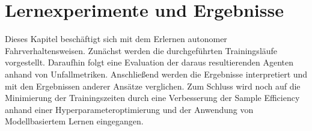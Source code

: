 
\cleardoublepage
\chapter{Lernexperimente und Ergebnisse}\label{ch:TrainingsAndResults}

Dieses Kapitel beschäftigt sich mit dem Erlernen autonomer Fahrverhaltensweisen.
Zunächst werden die durchgeführten Trainingsläufe vorgestellt. Daraufhin folgt
eine Evaluation der daraus resultierenden Agenten anhand von Unfallmetriken.
Anschließend werden die Ergebnisse interpretiert und mit den Ergebnissen anderer
Ansätze verglichen. Zum Schluss wird noch auf die Minimierung der Trainingszeiten
durch eine Verbesserung der Sample Efficiency anhand einer Hyperparameteroptimierung
und der Anwendung von Modellbasiertem Lernen eingegangen.




